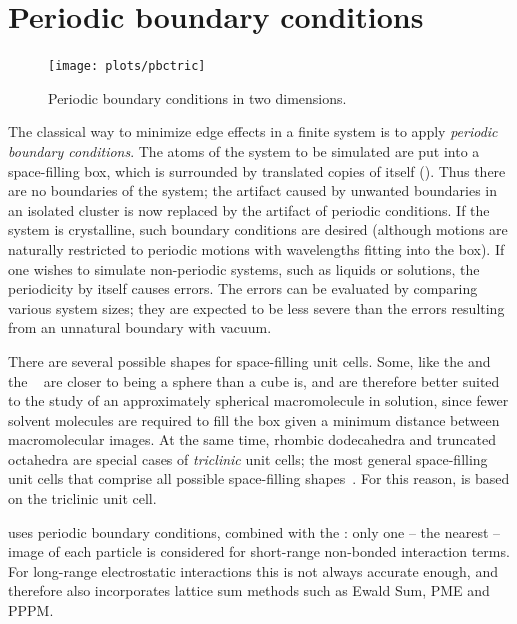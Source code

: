 \section{Periodic boundary conditions}
\label{sec:pbc}
\begin{figure}
\centerline{\texttt{[image: plots/pbctric]}}
\caption {Periodic boundary conditions in two dimensions.}
\label{fig:pbc}
\end{figure}
The classical way to minimize edge effects in a finite system is to
apply {\em periodic boundary conditions}. The atoms of the system to
be simulated are put into a space-filling box, which is surrounded by
translated copies of itself ().  Thus there are no
boundaries of the system; the artifact caused by unwanted boundaries
in an isolated cluster is now replaced by the artifact of periodic
conditions. If the system is crystalline, such boundary conditions are
desired (although motions are naturally restricted to periodic motions
with wavelengths fitting into the box). If one wishes to simulate
non-periodic systems, such as liquids or solutions, the periodicity by
itself causes errors. The errors can be evaluated by comparing various
system sizes; they are expected to be less severe than the errors
resulting from an unnatural boundary with vacuum.

There are several possible shapes for space-filling unit cells. Some,
like the {\em {}} and the
{\em {}}~\cite{Adams79} are closer to being a sphere
than a cube is, and are therefore better suited to the 
study of an approximately spherical macromolecule in solution, since
fewer solvent molecules are required to fill the box given a minimum
distance between macromolecular images. At the same time, rhombic 
dodecahedra and truncated octahedra are special cases of {\em triclinic} 
unit cells; the most general space-filling unit cells
that comprise all possible space-filling shapes~\cite{Bekker95}.
For this reason, {\gromacs} is based on the triclinic unit cell.
  
{\gromacs} uses periodic boundary conditions, combined with the {\em
{}}: only one -- the nearest -- image of each
particle is considered for short-range non-bonded interaction terms.
For long-range electrostatic interactions this is not always accurate
enough, and {\gromacs} therefore also incorporates lattice sum methods
such as Ewald Sum, PME and PPPM.

